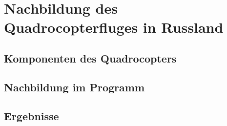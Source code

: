 \chapter{Nachbildung des Quadrocopterfluges in Russland}
\label{chap:nachbildung_des_quadrocopter}
\blindtext[1]
\section{Komponenten des Quadrocopters}
\label{sec:komponenten}
\blindtext[2]
\section{Nachbildung im Programm}
\label{sec:nachbildung_im_programm}
\blindtext[1]
\blindenumerate[3]
\section{Ergebnisse}
\label{sec:ergebnisse_quadrocopter}
\blindtext[1]
